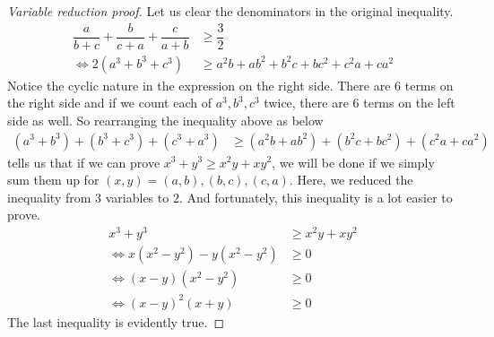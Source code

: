 \documentclass{subfile}
\begin{document}
		\begin{proof}[\itshape {}Variable reduction proof]
			Let us clear the denominators in the original inequality.
				\begin{align*}
					\dfrac{a}{b+c}+\dfrac{b}{c+a}+\dfrac{c}{a+b}
						& \geq\dfrac{3}{2}\\
					\iff2(a^3+b^3+c^3)
						& \geq a^2b+ab^2+b^2c+bc^2+c^2a+ca^2
				\end{align*}
			Notice the cyclic nature in the expression on the right side. There are $6$ terms on the right side and if we count each of $a^3,b^3,c^3$ twice, there are $6$ terms on the left side as well. So rearranging the inequality above as below
				\begin{align*}
					(a^3+b^3)+(b^3+c^3)+(c^3+a^3)
						& \geq (a^2b+ab^2)+(b^2c+bc^2)+(c^2a+ca^2)
				\end{align*}
			tells us that if we can prove $x^3+y^3\geq x^2y+xy^2$, we will be done if we simply sum them up for $(x,y)=(a,b),(b,c),(c,a)$. Here, we reduced the inequality from $3$ variables to $2$. And fortunately, this inequality is a lot easier to prove.
				\begin{align*}
					x^3+y^3
						& \geq x^2y+xy^2\\
					\iff x(x^2-y^2)-y(x^2-y^2)
						& \geq0\\
					\iff (x-y)(x^2-y^2)
						& \geq0\\
					\iff(x-y)^2(x+y)
						& \geq0
				\end{align*}
			The last inequality is evidently true.
		\end{proof}
\end{document}
